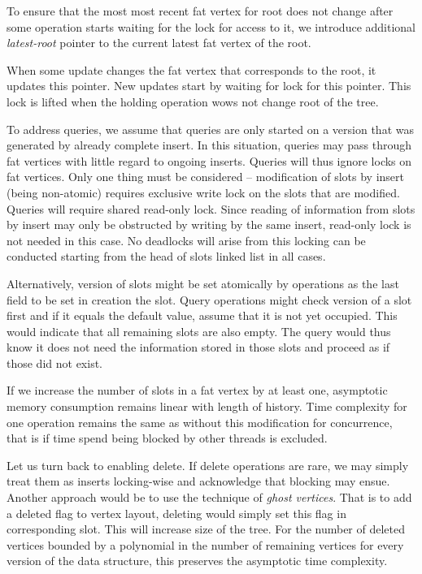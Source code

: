 To ensure that the most most recent fat vertex for root does not change after some operation starts waiting for the lock for access to it, we introduce additional \emph{latest-root} pointer to the current latest fat vertex of the root. 

When some update changes the fat vertex that corresponds to the root, it updates this pointer. New updates start by waiting for lock for this pointer. This lock is lifted when the holding operation wows not change root of the tree.

To address queries, we assume that queries are only started on a version that was generated by already complete insert. In this situation, queries may pass through fat vertices with little regard to ongoing inserts. Queries will thus ignore locks on fat vertices. Only one thing must be considered -- modification of slots by insert (being non-atomic) requires exclusive write lock on the slots that are modified. Queries will require shared read-only lock. Since reading of information from slots by insert may only be obstructed by writing by the same insert, read-only lock is not needed in this case. No deadlocks will arise from this locking can be conducted starting from the head of slots linked list in all cases. 

Alternatively, version of slots might be set atomically by operations as the last field to be set in creation the slot. Query operations might check version of a slot first and if it equals the default value, assume that it is not yet occupied. This would indicate that all remaining slots are also empty. The query would thus know it does not need the information stored in those slots and proceed as if those did not exist.

If we increase the number of slots in a fat vertex by at least one, asymptotic memory consumption remains linear with length of history. Time complexity for one operation remains the same as without this modification for concurrence, that is if time spend being blocked by other threads is excluded.

Let us turn back to enabling delete. If delete operations are rare, we may simply treat them as inserts locking-wise and acknowledge that blocking may ensue. Another approach would be to use the technique of \textit{ghost vertices}. That is to add a deleted flag to vertex layout, deleting would simply set this flag in corresponding slot. This will increase size of the tree. For the number of deleted vertices bounded by a polynomial in the number of remaining vertices for every version of the data structure, this preserves the asymptotic time complexity. 

